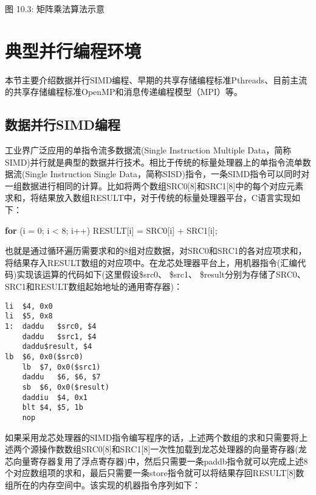 \documentclass[]{ctexbook}
\newenvironment{Shaded}{\begin{snugshade}}{\end{snugshade}}
\newcommand{\ControlFlowTok}[1]{\textcolor[rgb]{0.13,0.29,0.53}{\textbf{#1}}}
\newcommand{\DecValTok}[1]{\textcolor[rgb]{0.00,0.00,0.81}{#1}}
\newcommand{\NormalTok}[1]{#1}
\begin{document}
图 10.3: 矩阵乘法算法示意

\hypertarget{ux5178ux578bux5e76ux884cux7f16ux7a0bux73afux5883}{%
\section{典型并行编程环境}\label{ux5178ux578bux5e76ux884cux7f16ux7a0bux73afux5883}}

本节主要介绍数据并行SIMD编程、早期的共享存储编程标准Pthreads、目前主流的共享存储编程标准OpenMP和消息传递编程模型（MPI）等。

\hypertarget{ux6570ux636eux5e76ux884csimdux7f16ux7a0b}{%
\subsection{数据并行SIMD编程}\label{ux6570ux636eux5e76ux884csimdux7f16ux7a0b}}

工业界广泛应用的单指令流多数据流(Single Instruction Multiple Data，简称SIMD)并行就是典型的数据并行技术。相比于传统的标量处理器上的单指令流单数据流(Single Instruction Single Data，简称SISD)指令，一条SIMD指令可以同时对一组数据进行相同的计算。比如将两个数组SRC0{[}8{]}和SRC1{[}8{]}中的每个对应元素求和，将结果放入数组RESULT中，对于传统的标量处理器平台，C语言实现如下：

\begin{Shaded}
\begin{Highlighting}[]
\ControlFlowTok{for}\NormalTok{ (i = }\DecValTok{0}\NormalTok{; i \textless{} }\DecValTok{8}\NormalTok{; i++)}
\NormalTok{        RESULT[i] = SRC0[i] + SRC1[i];}
\end{Highlighting}
\end{Shaded}

也就是通过循环遍历需要求和的8组对应数据，对SRC0和SRC1的各对应项求和，将结果存入RESULT数组的对应项中。在龙芯处理器平台上，用机器指令(汇编代码)实现该运算的代码如下(这里假设\$src0、 \$src1、 \$result分别为存储了SRC0、 SRC1和RESULT数组起始地址的通用寄存器)：

\begin{verbatim}
li  $4, 0x0
li  $5, 0x8
1:  daddu   $src0, $4
    daddu   $src1, $4
    daddu$result, $4
lb  $6, 0x0($src0)
    lb  $7, 0x0($src1)
    daddu   $6, $6, $7
    sb  $6, 0x0($result)
    daddiu  $4, 0x1
    blt $4, $5, 1b
    nop
\end{verbatim}

如果采用龙芯处理器的SIMD指令编写程序的话，上述两个数组的求和只需要将上述两个源操作数数组SRC0{[}8{]}和SRC1{[}8{]}一次性加载到龙芯处理器的向量寄存器(龙芯向量寄存器复用了浮点寄存器)中，然后只需要一条paddb指令就可以完成上述8个对应数组项的求和，最后只需要一条store指令就可以将结果存回RESULT{[}8{]}数组所在的内存空间中。该实现的机器指令序列如下：
\end{document}
